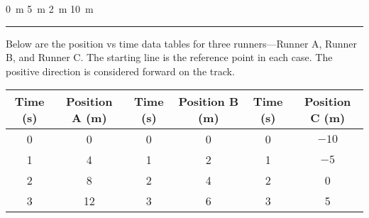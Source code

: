 \documentclass[]{exam}
\begin{document}
\begin{questions}
\begin{randomizechoices}[norandomize]
    \choice \SI{0}{m}
    \choice \SI{5}{m}
    \choice \SI{2}{m}
    \correctchoice \SI{10}{m}
\end{randomizechoices}

\bigskip
\hrule


\question
Below are the position vs time data tables for three runners---Runner A, Runner B, and Runner C. The starting line is the reference point in each case. The positive direction is considered forward on the track.

    
    \begin{table}[h!]
        \centering
        \begin{tabular}{|c|c||c|c||c|c|}
            \hline
             \textbf{Time} (s) & \textbf{Position} A (m) & \textbf{Time} (s) & \textbf{Position} B (m) & \textbf{Time} (s) & \textbf{Position} C (m)\\ \hline
             0 & 0 & 0 & 0 & 0 & $-10$\\ \hline
             1 & 4 & 1 & 2 & 1 & $-5$ \\ \hline
             2 & 8 & 2 & 4 & 2 & 0\\ \hline
             3 & 12 & 3 & 6 & 3 & 5\\ \hline
        \end{tabular}
    \end{table}







\end{questions}
\end{document}
